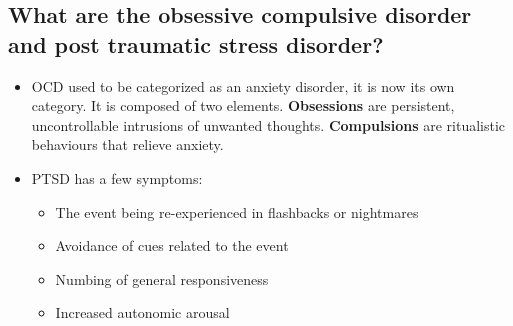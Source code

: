 \documentclass[10pt,letter]{article}
\theoremstyle{plain}
\theoremstyle{definition}
\begin{document}
\subsection*{What are the obsessive compulsive disorder and post traumatic stress disorder?}
\begin{itemize}
    \item OCD used to be categorized as an anxiety disorder, it is now its own category. It is composed of two elements. \textbf{Obsessions} are persistent, uncontrollable intrusions of unwanted thoughts. \textbf{Compulsions} are ritualistic behaviours that relieve anxiety. 
    \item PTSD has a few symptoms: \begin{itemize}
        \item The event being re-experienced in flashbacks or nightmares 
        \item Avoidance of cues related to the event
        \item Numbing of general responsiveness 
        \item Increased autonomic arousal
    \end{itemize}
\end{itemize}
\end{document}
